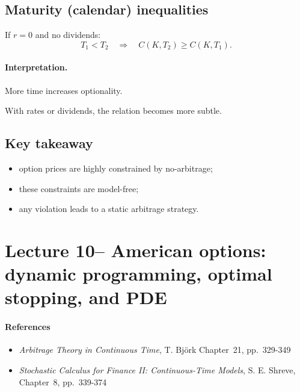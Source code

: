 \documentclass[11pt]{article}
\newcommand{\1}{\mathbf{1}}
\theoremstyle{plain}
\theoremstyle{definition}
\theoremstyle{remark}
\begin{document}
\subsection{Maturity (calendar) inequalities}

If \(r=0\) and no dividends:
\[
\boxed{
T_1<T_2
\quad\Rightarrow\quad
C(K,T_2)\ge C(K,T_1).
}
\]

\paragraph{Interpretation.}
More time increases optionality.

\medskip

With rates or dividends, the relation becomes more subtle.

\subsection{Key takeaway}

\begin{itemize}[leftmargin=1.4em]
\item option prices are highly constrained by no-arbitrage;
\item these constraints are model-free;
\item any violation leads to a static arbitrage strategy.
\end{itemize}

\section{Lecture 10-- American options: dynamic programming, optimal stopping, and PDE}


\paragraph{References}

\begin{itemize}[leftmargin=1.4em]

\item \textit{Arbitrage Theory in Continuous Time},  
T. Björk  
\hfill Chapter~21, pp.~329-349

\item \textit{Stochastic Calculus for Finance II: Continuous-Time Models},  
S. E. Shreve, Chapter~8, pp.~339-374

\end{itemize}
\end{document}
